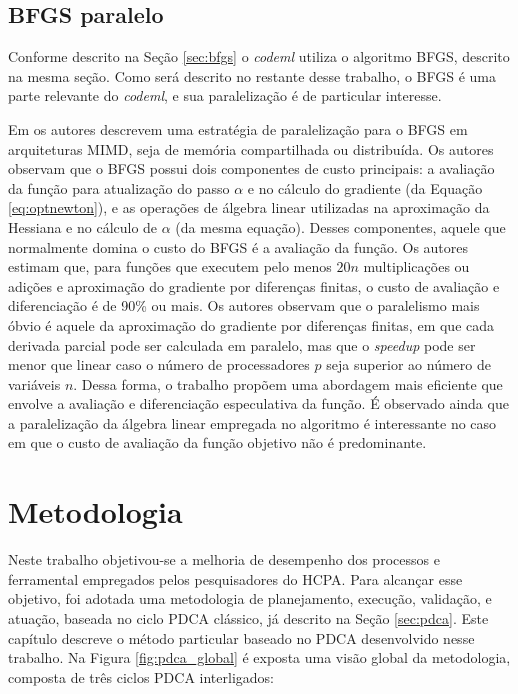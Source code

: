 \documentclass[cic,tc]{iiufrgs}
\begin{document}
\section{BFGS paralelo}
\label{sec:parbfgs}

Conforme descrito na Seção \ref{sec:bfgs} o \textit{codeml} utiliza o algoritmo BFGS,
descrito na mesma seção. Como será descrito no restante desse trabalho, o BFGS
é uma parte relevante do \textit{codeml}, e sua paralelização é de particular interesse.

Em \cite{byrd1988parallel} os autores descrevem uma estratégia de paralelização
para o BFGS em arquiteturas MIMD, seja de memória compartilhada ou distribuída.
Os autores observam que o BFGS possui dois componentes de custo principais: a
avaliação da função para atualização do passo $\alpha$ e no cálculo do
gradiente (da Equação \ref{eq:optnewton}), e as operações de álgebra linear
utilizadas na aproximação da Hessiana e no cálculo de $\alpha$ (da mesma
equação). Desses componentes, aquele que normalmente domina o custo do BFGS é a
avaliação da função. Os autores estimam que, para funções que executem pelo
menos $20n$ multiplicações ou adições e aproximação do gradiente por diferenças
finitas, o custo de avaliação e diferenciação é de 90\% ou mais. Os autores
observam que o paralelismo mais óbvio é aquele da aproximação do gradiente por
diferenças finitas, em que cada derivada parcial pode ser calculada em
paralelo, mas que o \textit{speedup} pode ser menor que linear caso o número de
processadores $p$ seja superior ao número de variáveis $n$. Dessa forma, o
trabalho propõem uma abordagem mais eficiente que envolve a avaliação e
diferenciação especulativa da função. É observado ainda que a paralelização da
álgebra linear empregada no algoritmo é interessante no caso em que o custo de
avaliação da função objetivo não é predominante.

%
%
%
%

\chapter{Metodologia}
\label{chap:mod}

Neste trabalho objetivou-se a melhoria de desempenho dos processos e
ferramental empregados pelos pesquisadores do HCPA. Para alcançar esse
objetivo, foi adotada uma metodologia de planejamento, execução, validação, e
atuação, baseada no ciclo PDCA clássico, já descrito na Seção \ref{sec:pdca}.
Este capítulo descreve o método particular baseado no PDCA desenvolvido nesse
trabalho. Na Figura \ref{fig:pdca_global} é exposta uma visão global da
metodologia, composta de três ciclos PDCA interligados:
\end{document}
